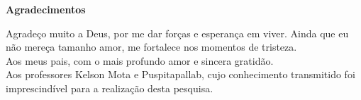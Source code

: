 \begin{flushleft}
\Huge\bfseries{Agradecimentos} 
\end{flushleft}

\vspace{0.5cm}

Agradeço muito a Deus, por me dar forças e esperança em viver. Ainda que eu não mereça tamanho amor, me fortalece nos momentos de tristeza. \\

Aos meus pais, com o mais profundo amor e sincera gratidão. \\

Aos professores Kelson Mota e Puspitapallab, cujo conhecimento transmitido foi imprescindível para a realização desta pesquisa. \\

